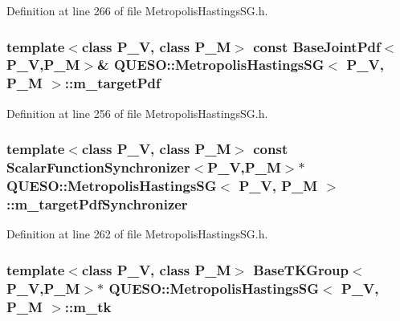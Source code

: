 Definition at line 266 of file Metropolis\-Hastings\-S\-G.\-h.

\hypertarget{class_q_u_e_s_o_1_1_metropolis_hastings_s_g_a42ce4ffcb3addf62dd3f19fe8bb09268}{
\subsubsection[{m\-\_\-target\-Pdf}]{\setlength{\rightskip}{0pt plus 5cm}template$<$class P\-\_\-\-V, class P\-\_\-\-M$>$ const {\bf Base\-Joint\-Pdf}$<$P\-\_\-\-V,P\-\_\-\-M$>$\& {\bf Q\-U\-E\-S\-O\-::\-Metropolis\-Hastings\-S\-G}$<$ P\-\_\-\-V, P\-\_\-\-M $>$\-::m\-\_\-target\-Pdf\hspace{0.3cm}{\ttfamily [private]}}}\label{class_q_u_e_s_o_1_1_metropolis_hastings_s_g_a42ce4ffcb3addf62dd3f19fe8bb09268}


Definition at line 256 of file Metropolis\-Hastings\-S\-G.\-h.

\hypertarget{class_q_u_e_s_o_1_1_metropolis_hastings_s_g_ae7c7551764e0ccdfbe2862c544cdab10}{
\subsubsection[{m\-\_\-target\-Pdf\-Synchronizer}]{\setlength{\rightskip}{0pt plus 5cm}template$<$class P\-\_\-\-V, class P\-\_\-\-M$>$ const {\bf Scalar\-Function\-Synchronizer}$<$P\-\_\-\-V,P\-\_\-\-M$>$$\ast$ {\bf Q\-U\-E\-S\-O\-::\-Metropolis\-Hastings\-S\-G}$<$ P\-\_\-\-V, P\-\_\-\-M $>$\-::m\-\_\-target\-Pdf\-Synchronizer\hspace{0.3cm}{\ttfamily [private]}}}\label{class_q_u_e_s_o_1_1_metropolis_hastings_s_g_ae7c7551764e0ccdfbe2862c544cdab10}


Definition at line 262 of file Metropolis\-Hastings\-S\-G.\-h.

\hypertarget{class_q_u_e_s_o_1_1_metropolis_hastings_s_g_a26e9680abddfb793486c995fa16f8c2d}{
\subsubsection[{m\-\_\-tk}]{\setlength{\rightskip}{0pt plus 5cm}template$<$class P\-\_\-\-V, class P\-\_\-\-M$>$ {\bf Base\-T\-K\-Group}$<$P\-\_\-\-V,P\-\_\-\-M$>$$\ast$ {\bf Q\-U\-E\-S\-O\-::\-Metropolis\-Hastings\-S\-G}$<$ P\-\_\-\-V, P\-\_\-\-M $>$\-::m\-\_\-tk\hspace{0.3cm}{\ttfamily [private]}}}\label{class_q_u_e_s_o_1_1_metropolis_hastings_s_g_a26e9680abddfb793486c995fa16f8c2d}


